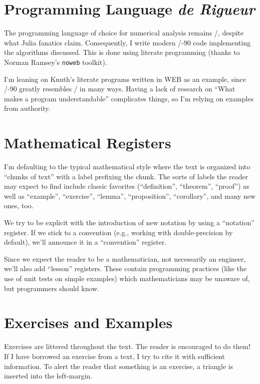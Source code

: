 \section*{Programming Language \textit{de Rigueur}}

The programming language of choice for numerical analysis remains
\FORTRAN/, despite what Julia fanatics claim. Consequently, I write
modern \FORTRAN/-90 code implementing the algorithms discussed. This is
done using literate programming (thanks to Norman Ramsey's {\tt noweb}
toolkit).

I'm leaning on Knuth's literate programs written in WEB as an example,
since \FORTRAN/-90 greatly resembles \PASCAL/ in many ways. Having a
lack of research on ``What makes a program understandable'' complicates
things, so I'm relying on examples from authority.

\section*{Mathematical Registers}

I'm defaulting to the typical mathematical style where the text is
organized into ``chunks of text'' with a label prefixing the chunk. The
sorts of labels the reader may expect to find include classic favorites
(``definition'', ``theorem'', ``proof'') as well as ``example'',
``exercise'', ``lemma'', ``proposition'', ``corollary'', and many new
ones, too.

We try to be explicit with the introduction of new notation by using a
``notation'' register. If we stick to a convention (e.g., working with
double-precision by default), we'll announce it in a ``convention'' register.

Since we expect the reader to be a mathematician, not necessarily an
engineer, we'll also add ``lesson'' registers. These contain programming
practices (like the use of unit tests on simple examples) which
mathematicians may be unaware of, but programmers should know.

\section*{Exercises and Examples}

Exercises are littered throughout the text. The reader is encouraged to
do them! If I have borrowed an exercise from a text, I try to cite it
with sufficient information. To alert the reader that something is an
exercise, a triangle is inserted into the left-margin.

